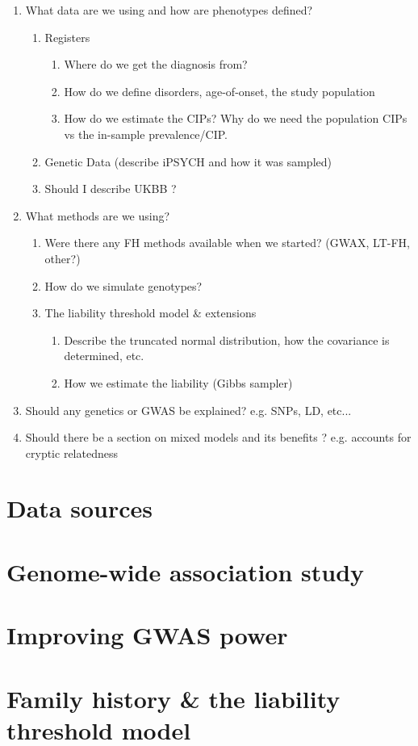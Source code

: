 
\begin{enumerate}
	\item What data are we using and how are phenotypes defined?
		\begin{enumerate}
			\item Registers
			\begin{enumerate}
				\item Where do we get the diagnosis from? 
				\item How do we define disorders, age-of-onset, the study population
				\item How do we estimate the CIPs? Why do we need the population CIPs vs the in-sample prevalence/CIP.
			\end{enumerate}
			\item Genetic Data (describe iPSYCH and how it was sampled)
			\item Should I describe UKBB ?
		\end{enumerate}
	\item What methods are we using?
	\begin{enumerate}
		\item Were there any FH methods available when we started? (GWAX, LT-FH, other?)
		\item How do we simulate genotypes?
		\item The liability threshold model \& extensions
		\begin{enumerate}
			\item Describe the truncated normal distribution, how the covariance is determined, etc.
			\item How we estimate the liability (Gibbs sampler)
		\end{enumerate}
	\end{enumerate} 
	\item Should any genetics or GWAS be explained? e.g. SNPs, LD, etc... 
	\item Should there be a section on mixed models and its benefits ? e.g. accounts for cryptic relatedness
\end{enumerate}


\section{Data sources}




\section{Genome-wide association study}


\section{Improving GWAS power}


\section{Family history \& the liability threshold model}







